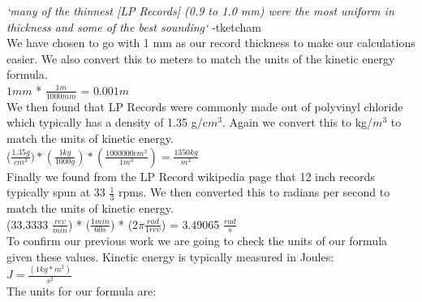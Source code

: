 \documentclass[a4paper, 11pt, oneside]{book} %
\begin{document}
\textit{`many of the thinnest [LP Records] (0.9 to 1.0 mm) were the most uniform in thickness and some of the best sounding`} 
-tketcham \\
We have chosen to go with 1 mm as our record thickness to make our calculations easier. We also convert this to meters to match the units of the kinetic energy formula.\\
\vspace{0.5\baselineskip} %
$1mm$ * $\frac{1m}{1000mm}$ = $0.001m$\\
\vspace{0.5\baselineskip} %
We then found that LP Records were commonly made out of polyvinyl chloride which typically has a density of 1.35 g/c$m^3$. Again we convert this to kg/$m^3$ to match the units of kinetic energy.\\
\vspace{0.5\baselineskip} %
($\frac{1.35g}{cm^3}) * (\frac{1kg}{1000g}) * (\frac{1000000cm^3}{1m^3}) = \frac{1350kg}{m^3}$\\
\vspace{0.5\baselineskip} %
Finally we found from the LP Record wikipedia page that 12 inch records typically spun at 33 $\frac{1}{3}$ rpms. We then converted this to radians per second to match the units of kinetic energy. \\
\vspace{0.5\baselineskip} %
(33.3333 $\frac{rev}{min}$) * ($\frac{1min}{60s}$) * (2$\pi \frac{rad}{1rev}$) = 3.49065 $\frac{rad}{s}$\\
\vspace{0.5\baselineskip} %
To confirm our previous work we are going to check the units of our formula given these values. Kinetic energy is typically measured in Joules:\\
\vspace{0.5\baselineskip} %
\large{$J = \frac{(1kg * m^2)}{s^2}$}\\
\vspace{0.5\baselineskip} %
The units for our formula are: \\
\vspace{0.5\baselineskip} %
\end{document}
